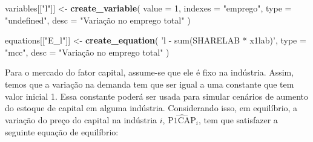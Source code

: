 \documentclass[12pt,twoside]{article}
\newenvironment{Shaded}{\begin{snugshade}}{\end{snugshade}}
\newcommand{\DataTypeTok}[1]{\textcolor[rgb]{0.13,0.29,0.53}{#1}}
\newcommand{\DecValTok}[1]{\textcolor[rgb]{0.00,0.00,0.81}{#1}}
\newcommand{\KeywordTok}[1]{\textcolor[rgb]{0.13,0.29,0.53}{\textbf{#1}}}
\newcommand{\NormalTok}[1]{#1}
\newcommand{\OperatorTok}[1]{\textcolor[rgb]{0.81,0.36,0.00}{\textbf{#1}}}
\newcommand{\StringTok}[1]{\textcolor[rgb]{0.31,0.60,0.02}{#1}}
\let\oldShaded\Shaded
\let\endoldShaded\endShaded
\renewenvironment{Shaded}{\footnotesize\oldShaded}{\endoldShaded}
\begin{document}
\begin{Shaded}
\end{Shaded}

\begin{Shaded}
\begin{Highlighting}[]
\NormalTok{variables[[}\StringTok{"l"}\NormalTok{]] <-}\StringTok{ }\KeywordTok{create_variable}\NormalTok{(}
  \DataTypeTok{value =} \DecValTok{1}\NormalTok{,}
  \DataTypeTok{indexes =} \StringTok{"emprego"}\NormalTok{,}
  \DataTypeTok{type =} \StringTok{"undefined"}\NormalTok{,}
  \DataTypeTok{desc =} \StringTok{"Variação no emprego total"}
\NormalTok{)}
\end{Highlighting}
\end{Shaded}

\begin{Shaded}
\begin{Highlighting}[]
\NormalTok{equations[[}\StringTok{"E_l"}\NormalTok{]] <-}\StringTok{ }\KeywordTok{create_equation}\NormalTok{(}
  \StringTok{'l - sum(SHARELAB * x1lab)'}\NormalTok{,}
  \DataTypeTok{type =} \StringTok{"mcc"}\NormalTok{,}
  \DataTypeTok{desc =} \StringTok{"Variação no emprego total"}
\NormalTok{)}
\end{Highlighting}
\end{Shaded}

Para o mercado do fator capital, assume-se que ele é fixo na indústria.
Assim, temos que a variação na demanda tem que ser igual a uma constante
que tem valor inicial 1. Essa constante poderá ser usada para simular
cenários de aumento do estoque de capital em alguma indústria.
Considerando isso, em equilíbrio, a variação do preço do capital na
indústria \(i\), \(\hat{\text{P1CAP}}_i\), tem que satisfazer a seguinte
equação de equilíbrio:
\end{document}
